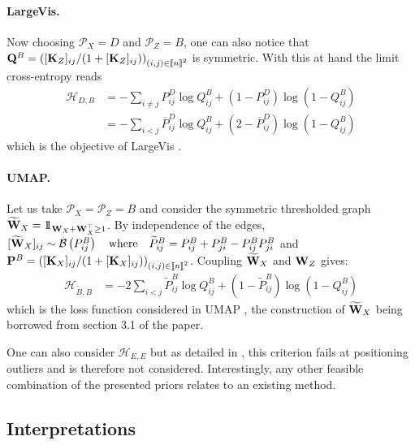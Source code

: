 \paragraph{LargeVis.}
Now choosing $\mathcal{P}_{X} = D$ and $\mathcal{P}_{Z} = B$, one can also notice that $\mathbf{Q}^{B} = \left( [\mathbf{K}_Z]_{ij} / (1+[\mathbf{K}_Z]_{ij}) \right)_{(i,j) \in {[\![n]\!]}^2}$ is symmetric. With this at hand the limit cross-entropy reads
\begin{align*}
    \mathcal{H}_{D,B} &= - \sum_{i \neq j} P^{D}_{ij} \log Q^{B}_{ij} + \left(1 - P^{D}_{ij} \right) \log\left(1-Q^{B}_{ij} \right) \\
    &= - \sum_{i < j} \overline{P}^{D}_{ij} \log Q^{B}_{ij} + \left(2-\overline{P}^{D}_{ij}\right) \log (1- Q^{B}_{ij})
\end{align*}
which is the objective of LargeVis \cite{tang2016visualizing}.

\paragraph{UMAP.}
Let us take $\mathcal{P}_{X} = \mathcal{P}_{Z} = B$ and consider the symmetric thresholded graph $\widetilde{\mathbf{W}}_{X} = 1\!\!1_{\mathbf{W}_{X} + \mathbf{W}_X^\top \geq 1}$. By independence of the edges, $[\widetilde{\mathbf{W}}_{X}]_{ij} \sim \mathcal{B}\left(P^{B}_{ij} \right) \quad \text{where} \quad  \widetilde{P}^{B}_{ij} = P^{B}_{ij} + P^{B}_{ji} - P^{B}_{ij} P^{B}_{ji}$ and $\mathbf{P}^{B} = \left( [\mathbf{K}_X]_{ij} / (1+[\mathbf{K}_X]_{ij}) \right)_{(i,j) \in {[\![n]\!]}^2}$. Coupling $\widetilde{\mathbf{W}}_{X}$ and $\mathbf{W}_{Z}$ gives:
\begin{align*}
    \mathcal{H}_{\widetilde{B},B} &= -2 \sum_{i<j} \widetilde{P}_{ij}^{B} \log Q_{ij}^{B} + \left(1 - \widetilde{P}_{ij}^{B} \right) \log \left( 1 - Q_{ij}^{B} \right)
\end{align*}
which is the loss function considered in UMAP \cite{mcinnes2018umap}, the construction of $\widetilde{\mathbf{W}}_{X}$ being borrowed from section 3.1 of the paper.

\begin{remark}
One can also consider $\mathcal{H}_{E,E}$ but as detailed in \cite{maaten2008tSNE}, this criterion fails at positioning outliers and is therefore not considered. 
Interestingly, any other feasible combination of the presented priors relates to an existing method.
\end{remark}

\subsection{Interpretations}\label{sec:interpretations}

